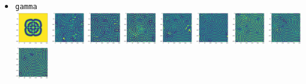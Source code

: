\begin{itemize}
\item {\tt gamma}\\
\includegraphics[height=1.4cm]{python_codes/fieldstone_171/pearson93_rand/gamma_solution_0001000_u}
\includegraphics[height=1.4cm]{python_codes/fieldstone_171/pearson93_rand/gamma_solution_0005000_u}
\includegraphics[height=1.4cm]{python_codes/fieldstone_171/pearson93_rand/gamma_solution_0010000_u}
\includegraphics[height=1.4cm]{python_codes/fieldstone_171/pearson93_rand/gamma_solution_0015000_u}
\includegraphics[height=1.4cm]{python_codes/fieldstone_171/pearson93_rand/gamma_solution_0020000_u}
\includegraphics[height=1.4cm]{python_codes/fieldstone_171/pearson93_rand/gamma_solution_0030000_u}
\includegraphics[height=1.4cm]{python_codes/fieldstone_171/pearson93_rand/gamma_solution_0040000_u}
\includegraphics[height=1.4cm]{python_codes/fieldstone_171/pearson93_rand/gamma_solution_0050000_u}
\includegraphics[height=1.4cm]{python_codes/fieldstone_171/pearson93_rand/gamma_solution_final_u} \\

\end{itemize}
